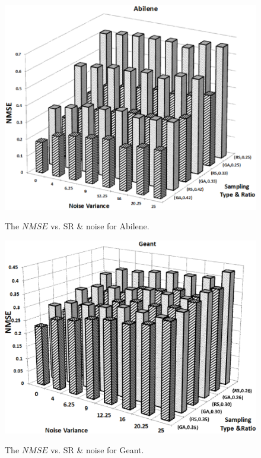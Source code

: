 \begin{figure}
\begin{center}
  \includegraphics[width=\linewidth]{AbileneDelayNoise1.png} \hfill
  \caption{{The $NMSE$ vs. SR \& noise for Abilene.}} \label{fig:AbileneGADelayNoise}
\endminipage\hfill
{}
  \includegraphics[width=\linewidth]{GeantDelayNoise1.png}
  \caption{{The $NMSE$ vs. SR \& noise for Geant.}} \label{fig:GeantGADelayNoise}
\endminipage
\end{center}
\end{figure}

